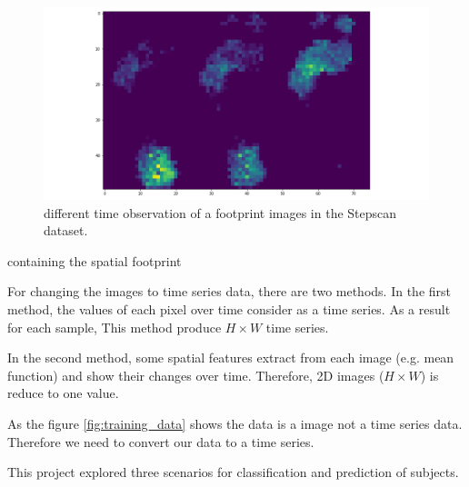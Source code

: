 \begin{figure}[]
    \centering
    \includegraphics{figures/project/frame1.png}
    \caption{different time observation of a footprint images in the Stepscan dataset.}
    \label{fig:Stepscan_dataset}
\end{figure}


containing the spatial footprint

For changing the images to time series data, there are two methods. In the first method, the values of each pixel over time consider as a time series. As a result for each sample, This method produce $H × W$ time series.

In the second method, some spatial features extract from each image (e.g. mean function) and show their changes over time. Therefore, 2D images ($H × W$) is reduce to one value.

As the figure \ref{fig:training_data} shows the data is a image not a time series data. Therefore we need to convert our data to a time series. 



This project explored three scenarios for classification and prediction of subjects.
